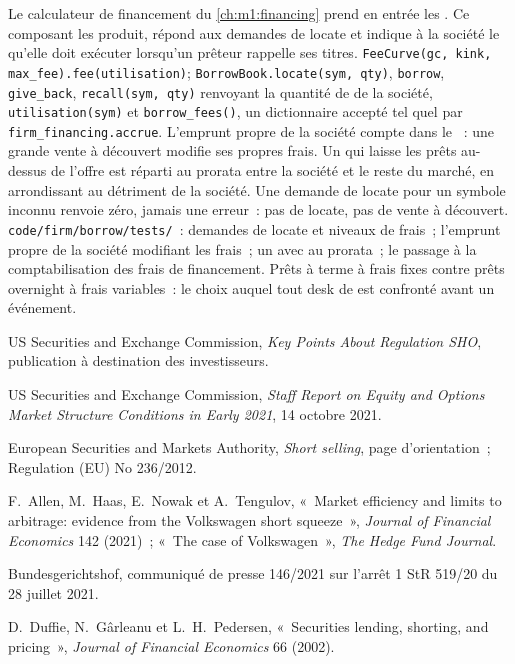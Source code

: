 \begin{build}
 Le calculateur de financement du \cref{ch:m1:financing} prend
en entrée les . Ce composant les produit, répond aux demandes de locate
et indique à la société le  qu'elle doit exécuter lorsqu'un prêteur rappelle ses titres.
 \texttt{FeeCurve(gc, kink, max\_fee).fee(utilisation)};
\texttt{BorrowBook.locate(sym, qty)}, \texttt{borrow}, \texttt{give\_back},
\texttt{recall(sym, qty)} renvoyant la quantité de  de la société,
\texttt{utilisation(sym)} et \texttt{borrow\_fees()}, un dictionnaire accepté
tel quel par \texttt{firm\_financing.accrue}.
 L'emprunt propre de la société compte dans le ~: une grande vente
à découvert modifie ses propres frais. Un  qui laisse les prêts au-dessus de l'offre est réparti au prorata
entre la société et le reste du marché, en arrondissant au détriment de la société. Une
demande de locate pour un symbole inconnu renvoie zéro, jamais une erreur~: pas de locate, pas de
vente à découvert.
 \texttt{code/firm/borrow/tests/}~: demandes de locate et niveaux de
frais~; l'emprunt propre de la société modifiant les frais~; un  avec  au prorata~;
le passage à la comptabilisation des frais de financement.
 Prêts à terme à frais fixes contre prêts overnight à
frais variables~: le choix auquel tout desk de  est confronté avant un événement.
\end{build}

\begin{omsources}
\item US Securities and Exchange Commission, \emph{Key Points About
Regulation SHO}, publication à destination des investisseurs.
\item US Securities and Exchange Commission, \emph{Staff Report on Equity and
Options Market Structure Conditions in Early 2021}, 14 octobre 2021.
\item European Securities and Markets Authority, \emph{Short selling}, page
d'orientation~; Regulation (EU) No 236/2012.
\item F.~Allen, M.~Haas, E.~Nowak et A.~Tengulov, «~Market efficiency and
limits to arbitrage: evidence from the Volkswagen short squeeze~»,
\emph{Journal of Financial Economics} 142 (2021)~; «~The case of Volkswagen~»,
\emph{The Hedge Fund Journal}.
\item Bundesgerichtshof, communiqué de presse 146/2021 sur l'arrêt 1 StR 519/20 du
28 juillet 2021.
\item D.~Duffie, N.~Gârleanu et L.~H.~Pedersen, «~Securities lending,
shorting, and pricing~», \emph{Journal of Financial Economics} 66 (2002).
\end{omsources}

